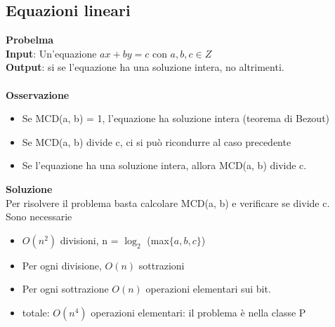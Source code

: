 \subsection{Equazioni lineari}
\textbf{Probelma}\\
\textbf{Input}: Un'equazione $ax + by = c$ con $a, b, c \in Z$
\\\textbf{Output}: si se l’equazione ha una soluzione intera, no altrimenti.\\\\
\textbf{Osservazione}
\begin{itemize}
    \item Se MCD(a, b) = 1, l’equazione ha soluzione intera (teorema di Bezout)
    
    \item Se MCD(a, b) divide c, ci si può ricondurre al caso precedente
    
    \item Se l’equazione ha una soluzione intera, allora MCD(a, b) divide c.
    
\end{itemize}
\textbf{Soluzione}\\
Per risolvere il problema basta calcolare MCD(a, b) e verificare se divide c.\\
Sono necessarie
\begin{itemize}
    \item $O(n^2)$ divisioni, n = $\log_2$ (max$\{a, b, c\}$)
    
    \item Per ogni divisione, $O(n)$ sottrazioni
    
    \item Per ogni sottrazione $O(n)$ operazioni elementari sui bit.
    
    \item totale: $O(n^4)$ operazioni elementari: il problema è nella classe P
\end{itemize}
\newpage
